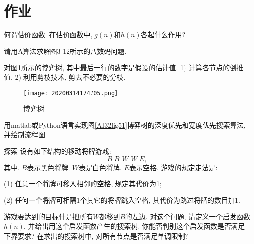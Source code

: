 \section{作业}
\begin{think}
    何谓估价函数, 在估价函数中, $g(n)$和$h(n)$各起什么作用?
\end{think}
\begin{think}
    请用A算法求解图3-12所示的八数码问题.
\end{think}
\begin{think}
    对图\ref{20200314174705fig51}所示的博弈树, 其中最后一行的数字是假设的估计值. 1) 计算各节点的倒推值. 2) 利用剪枝技术, 剪去不必要的分枝.
\begin{figure}[H]
    \centering
    \texttt{[image: 20200314174705.png]}
    \caption{博弈树}
    \label{20200314174705fig51}
\end{figure}
\end{think}
\begin{think}
    用matlab或Python语言实现图\ref{AI32fig51}博弈树的深度优先和宽度优先搜索算法, 并绘制流程图.
\end{think}
\begin{custom}[explorecolor]{探索}
设有如下结构的移动将牌游戏:$$B\,\,	B\,\,		W\,\,		W\,\,		E,$$
其中, $B$表示黑色将牌, $W$表是白色将牌, $E$表示空格. 游戏的规定走法是:

(1) 任意一个将牌可移入相邻的空格, 规定其代价为1;

(2) 任何一个将牌可相隔1个其它的将牌跳入空格, 其代价为跳过将牌的数目加1.

游戏要达到的目标什是把所有$W$都移到$B$的左边. 对这个问题, 请定义一个启发函数$h(n)$, 并给出用这个启发函数产生的搜索树.
你能否判别这个启发函数是否满足下界要求? 在求出的搜索树中, 对所有节点是否满足单调限制?
\end{custom}




